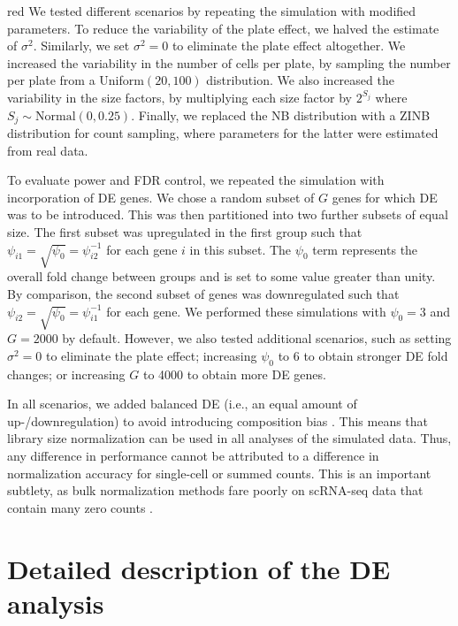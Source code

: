 \documentclass{article}
\begin{document}
\begin{color}{red}
We tested different scenarios by repeating the simulation with modified parameters.
To reduce the variability of the plate effect, we halved the estimate of $\sigma^2$. 
Similarly, we set $\sigma^2=0$ to eliminate the plate effect altogether.
We increased the variability in the number of cells per plate, by sampling the number per plate from a Uniform$(20, 100)$ distribution.
We also increased the variability in the size factors, by multiplying each size factor by $2^{S_j}$ where $S_j \sim \mbox{Normal}(0, 0.25)$.
Finally, we replaced the NB distribution with a ZINB distribution for count sampling, where parameters for the latter were estimated from real data.

To evaluate power and FDR control, we repeated the simulation with incorporation of DE genes.
We chose a random subset of $G$ genes for which DE was to be introduced.
This was then partitioned into two further subsets of equal size.
The first subset was upregulated in the first group such that $\psi_{i1} = \sqrt{\psi_0} = \psi_{i2}^{-1}$ for each gene $i$ in this subset.
The $\psi_0$ term represents the overall fold change between groups and is set to some value greater than unity.
By comparison, the second subset of genes was downregulated such that $\psi_{i2} = \sqrt{\psi_0} = \psi_{i1}^{-1}$ for each gene.
We performed these simulations with $\psi_0 =3$ and $G=2000$ by default.
However, we also tested additional scenarios, such as setting $\sigma^2=0$ to eliminate the plate effect; increasing $\psi_0$ to 6 to obtain stronger DE fold changes; or increasing $G$ to 4000 to obtain more DE genes.

In all scenarios, we added balanced DE (i.e., an equal amount of up-/downregulation) to avoid introducing composition bias \citep{robinson2010scaling}.
This means that library size normalization can be used in all analyses of the simulated data.
Thus, any difference in performance cannot be attributed to a difference in normalization accuracy for single-cell or summed counts.
This is an important subtlety, as bulk normalization methods fare poorly on scRNA-seq data that contain many zero counts \citep{lun2016pooling}.
\end{color}

\section{Detailed description of the DE analysis}
\end{document}
